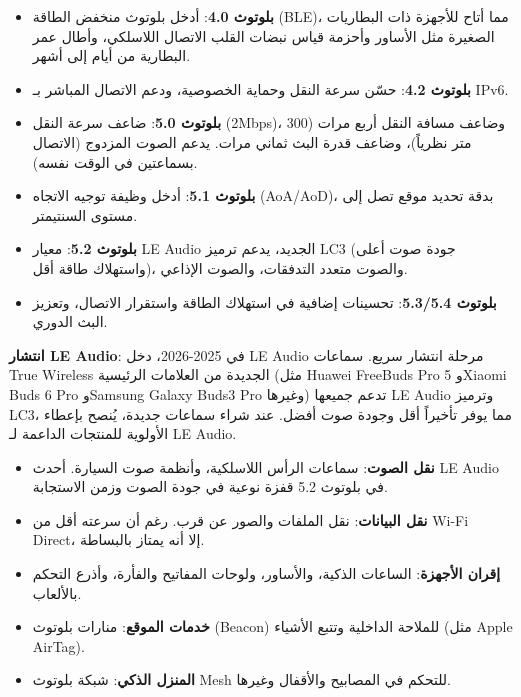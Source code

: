 
\begin{itemize}
  \item \textbf{بلوتوث 4.0}: أدخل بلوتوث منخفض الطاقة (BLE)، مما أتاح للأجهزة ذات البطاريات الصغيرة مثل الأساور وأحزمة قياس نبضات القلب الاتصال اللاسلكي، وأطال عمر البطارية من أيام إلى أشهر.
  \item \textbf{بلوتوث 4.2}: حسّن سرعة النقل وحماية الخصوصية، ودعم الاتصال المباشر بـ IPv6.
  \item \textbf{بلوتوث 5.0}: ضاعف سرعة النقل (2Mbps)، وضاعف مسافة النقل أربع مرات (300 متر نظرياً)، وضاعف قدرة البث ثماني مرات. يدعم الصوت المزدوج (الاتصال بسماعتين في الوقت نفسه).
  \item \textbf{بلوتوث 5.1}: أدخل وظيفة توجيه الاتجاه (AoA/AoD)، بدقة تحديد موقع تصل إلى مستوى السنتيمتر.
  \item \textbf{بلوتوث 5.2}: معيار LE Audio الجديد، يدعم ترميز LC3 (جودة صوت أعلى واستهلاك طاقة أقل)، والصوت متعدد التدفقات، والصوت الإذاعي.
  \item \textbf{بلوتوث 5.3/5.4}: تحسينات إضافية في استهلاك الطاقة واستقرار الاتصال، وتعزيز البث الدوري.
\end{itemize}

\textbf{انتشار LE Audio}: في 2025-2026، دخل LE Audio مرحلة انتشار سريع. سماعات True Wireless الجديدة من العلامات الرئيسية (مثل Huawei FreeBuds Pro 5 وXiaomi Buds 6 Pro وSamsung Galaxy Buds3 Pro وغيرها) تدعم جميعها LE Audio وترميز LC3، مما يوفر تأخيراً أقل وجودة صوت أفضل. عند شراء سماعات جديدة، يُنصح بإعطاء الأولوية للمنتجات الداعمة لـ LE Audio.


\begin{itemize}
  \item \textbf{نقل الصوت}: سماعات الرأس اللاسلكية، وأنظمة صوت السيارة. أحدث LE Audio في بلوتوث 5.2 قفزة نوعية في جودة الصوت وزمن الاستجابة.
  \item \textbf{نقل البيانات}: نقل الملفات والصور عن قرب. رغم أن سرعته أقل من Wi-Fi Direct، إلا أنه يمتاز بالبساطة.
  \item \textbf{إقران الأجهزة}: الساعات الذكية، والأساور، ولوحات المفاتيح والفأرة، وأذرع التحكم بالألعاب.
  \item \textbf{خدمات الموقع}: منارات بلوتوث (Beacon) للملاحة الداخلية وتتبع الأشياء (مثل Apple AirTag).
  \item \textbf{المنزل الذكي}: شبكة بلوتوث Mesh للتحكم في المصابيح والأقفال وغيرها.
\end{itemize}

